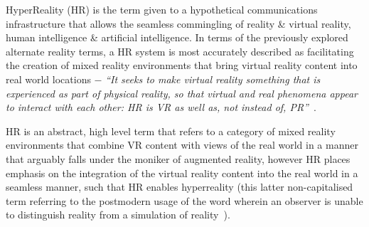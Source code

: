 HyperReality (HR) is the term given to a hypothetical communications infrastructure that allows the seamless commingling of reality \& virtual reality, human intelligence \& artificial intelligence. In terms of the previously explored alternate reality terms, a HR system is most accurately described as facilitating the creation of mixed reality environments that bring virtual reality content into real world locations $-$ \textit{``It seeks to make virtual reality something that is experienced as part of physical reality, so that virtual and real phenomena appear to interact with each other: HR is VR as well as, not instead of, PR''}~\cite{Terashima2001}.

HR is an abstract, high level term that refers to a category of mixed reality environments that combine VR content with views of the real world in a manner that arguably falls under the moniker of augmented reality, however HR places emphasis on the integration of the virtual reality content into the real world in a seamless manner, such that HR enables hyperreality (this latter non-capitalised term referring to the postmodern usage of the word wherein an observer is unable to distinguish reality from a simulation of reality~\cite{Baudrillard1994}).





